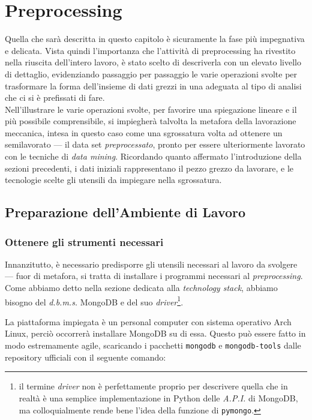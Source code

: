 \chapter{Preprocessing}

Quella che sarà descritta in questo capitolo è sicuramente la fase più impegnativa e delicata. Vista quindi l'importanza che l'attività di preprocessing ha rivestito nella riuscita dell'intero lavoro, è stato scelto di descriverla con un elevato livello di dettaglio, evidenziando passaggio per passaggio le varie operazioni svolte per trasformare la forma dell'insieme di dati grezzi in una adeguata al tipo di analisi che ci si è prefissati di fare. \\

Nell'illustrare le varie operazioni svolte, per favorire una spiegazione lineare e il più possibile comprensibile, si impiegherà talvolta la metafora della lavorazione meccanica, intesa in questo caso come una sgrossatura volta ad ottenere un semilavorato --- il data set \textit{preprocessato}, pronto per essere ulteriormente lavorato con le tecniche di \textit{data mining}. Ricordando quanto affermato l'introduzione della sezioni precedenti, i dati iniziali rappresentano il pezzo grezzo da lavorare, e le tecnologie scelte gli utensili da impiegare nella sgrossatura.

\section{Preparazione dell'Ambiente di Lavoro}

	\subsection{Ottenere gli strumenti necessari}

		Innanzitutto, è necessario predisporre gli utensili necessari al lavoro da svolgere --- fuor di metafora, si tratta di installare i programmi necessari al \textit{preprocessing}. Come abbiamo detto nella sezione dedicata alla \textit{technology stack}, abbiamo bisogno del \textit{d.b.m.s.} MongoDB e del suo \textit{driver}\footnote{il termine \textit{driver} non è perfettamente proprio per descrivere quella che in realtà è una semplice implementazione in Python delle \textit{A.P.I.} di MongoDB, ma colloquialmente rende bene l'idea della funzione di \texttt{pymongo}.}.

		La piattaforma impiegata è un personal computer con sistema operativo Arch Linux, perciò occorrerà installare MongoDB su di essa. Questo può essere fatto in modo estremamente agile, scaricando i pacchetti \texttt{mongodb} e \texttt{mongodb-tools} dalle repository ufficiali con il seguente comando:

